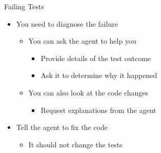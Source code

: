 \documentclass[
ps,
]{prosper}
\begin{document}
\begin{slide}{Failing Tests}

\begin{itemize}

\item You need to diagnose the failure

  \begin{itemize}
    
  \item You can ask the agent to help you

    \begin{itemize}
      
    \item Provide details of the test outcome

    \item Ask it to determine why it happened
      
    \end{itemize}
    
  \item You can also look at the code changes

    \begin{itemize}
      
    \item Request explanations from the agent

    \end{itemize}
    
  \end{itemize}

\item Tell the agent to fix the code

  \begin{itemize}
    
  \item It should not change the tests
    
  \end{itemize}
  
\end{itemize}
  
\end{slide}
\end{document}
